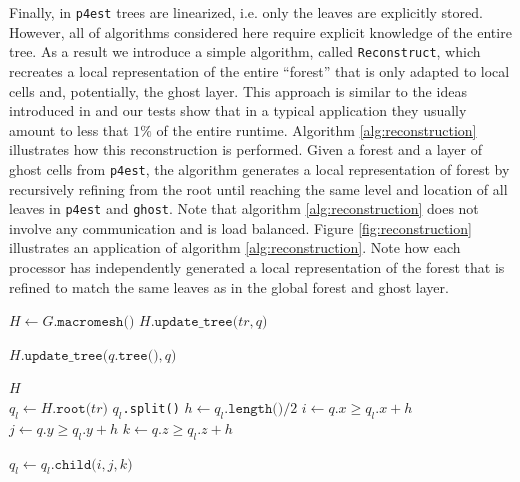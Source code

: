 Finally, in \texttt{p4est} trees are linearized, i.e. only the leaves are explicitly stored. However, all of algorithms considered here require explicit knowledge of the entire tree. As a result we introduce a simple algorithm, called \texttt{Reconstruct}, which recreates a local representation of the entire ``forest'' that is only adapted to local cells and, potentially, the ghost layer. This approach is similar to the ideas introduced in \cite{Bangerth;Burstedde;Heister;etal:11:Algorithms-and-data-} and our tests show that in a typical application they usually amount to less that $1\%$ of the entire runtime. Algorithm \ref{alg:reconstruction} illustrates how this reconstruction is performed. Given a forest and a layer of ghost cells from \texttt{p4est}, the algorithm generates a local representation of forest by recursively refining from the root until reaching the same level and location of all leaves in \texttt{p4est} and \texttt{ghost}. Note that algorithm \ref{alg:reconstruction} does not involve any communication and is load balanced. Figure \ref{fig:reconstruction} illustrates an application of algorithm \ref{alg:reconstruction}. Note how each processor has independently generated a local representation of the forest that is refined to match the same leaves as in the global forest and ghost layer.
\begin{algorithm}[htbp]
\caption{$H \gets \texttt{Reconstruct (}G\texttt{)}$} %
\begin{algorithmic}[1]
\State $H \gets G.\texttt{macromesh()}$
 
		\State $H.\texttt{update\_tree(} tr, q \texttt{)}$
	\EndFor
\EndFor

 
	\State $H.\texttt{update\_tree(} q.\texttt{tree()}, q \texttt{)}$
\EndFor

\State \Return $H$
\\
   
	\State $q_l \gets H.\texttt{root(}tr\texttt{)}$
		 $q_l$\texttt{.split()}
		\EndIf
		\State $h \gets q_l.\texttt{length()} / 2$ 
		\State $i \gets q.x \ge q_l.x + h$
		\State $j \gets q.y \ge q_l.y + h$
		\State $k \gets q.z \ge q_l.z + h$

		\State $q_l \gets q_l.\texttt{child(} i, j, k \texttt{)}$
	\EndWhile	
\EndFunction
\end{algorithmic}
\label{alg:reconstruction}
\end{algorithm}

